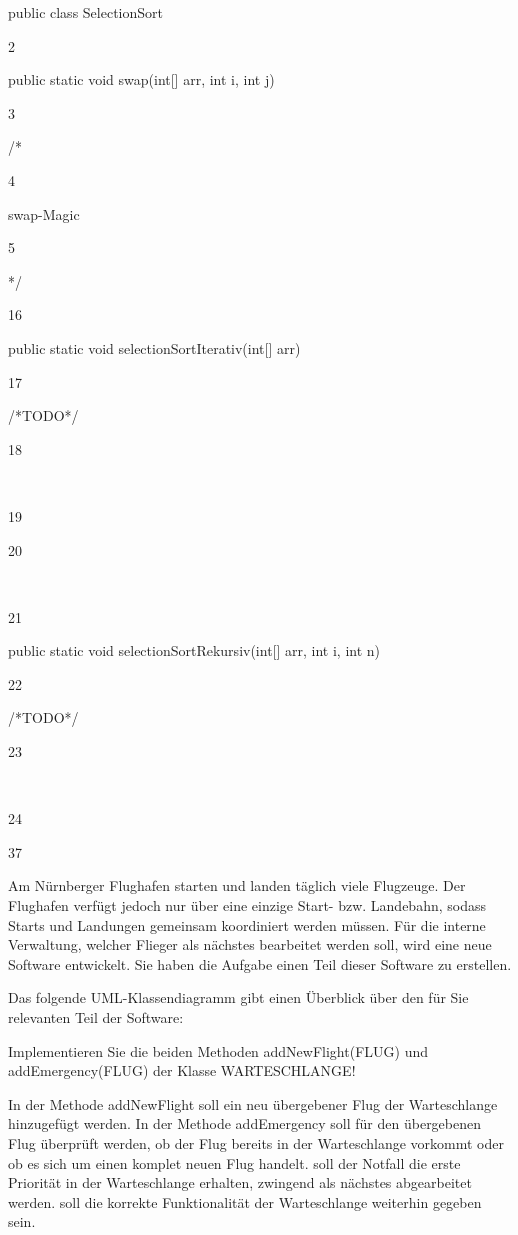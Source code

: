 \documentclass{lehramt-informatik-haupt}
\begin{document}
public class SelectionSort{

2

    public static void swap(int[] arr, int i, int j){

3

        /*

4

         swap-Magic

5

        */

16

    public static void selectionSortIterativ(int[] arr){

17

        /*TODO*/

18

​

19

    }

20

​

21

    public static void selectionSortRekursiv(int[] arr, int i, int n){

22

        /*TODO*/

23

​

24

    }

37

}

Am Nürnberger Flughafen starten und landen täglich viele Flugzeuge. Der Flughafen verfügt jedoch nur über eine einzige Start- bzw. Landebahn, sodass Starts und Landungen gemeinsam koordiniert werden müssen. Für die interne Verwaltung, welcher Flieger als nächstes bearbeitet werden soll, wird eine neue Software entwickelt. Sie haben die Aufgabe einen Teil dieser Software zu erstellen.

Das folgende UML-Klassendiagramm gibt einen Überblick über den für Sie relevanten Teil der Software:

Implementieren Sie die beiden Methoden addNewFlight(FLUG) und addEmergency(FLUG) der Klasse WARTESCHLANGE!

    In der Methode addNewFlight
        soll ein neu übergebener Flug der Warteschlange hinzugefügt werden.
    In der Methode addEmergency
        soll für den übergebenen Flug überprüft werden, ob der Flug bereits in der Warteschlange vorkommt oder ob es sich um einen komplet neuen Flug handelt.
        soll der Notfall die erste Priorität in der Warteschlange erhalten, \dh zwingend als nächstes abgearbeitet werden.
        soll die korrekte Funktionalität der Warteschlange weiterhin gegeben sein.

}
\end{document}
